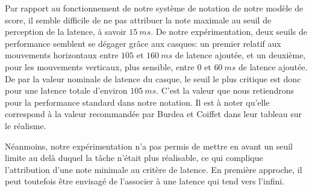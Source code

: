 	\par Par rapport au fonctionnement de notre système de notation de notre modèle de score, il semble difficile de ne pas attribuer la note maximale au seuil de perception de la latence, à savoir $15~ms$. De notre expérimentation, deux seuils de performance semblent se dégager grâce aux casques: un premier relatif aux mouvements horizontaux entre $105$ et $160~ms$ de latence ajoutée, et un deuxième, pour les mouvements verticaux, plus sensible, entre $0$ et $60~ms$ de latence ajoutée. De par la valeur nominale de latence du casque, le seuil le plus critique est donc pour une latence totale d'environ $105~ms$. C'est la valeur que nous retiendrons pour la performance standard dans notre notation. Il est à noter qu'elle correspond à la valeur recommandée par Burdea et Coiffet dans leur tableau sur le réalisme.
	
	\par Néanmoins, notre expérimentation n'a pas permis de mettre en avant un seuil limite au delà duquel la tâche n'était plus réalisable, ce qui complique l'attribution d'une note minimale au critère de latence. En première approche, il peut toutefois être envisagé de l'associer à une latence qui tend vers l'infini.